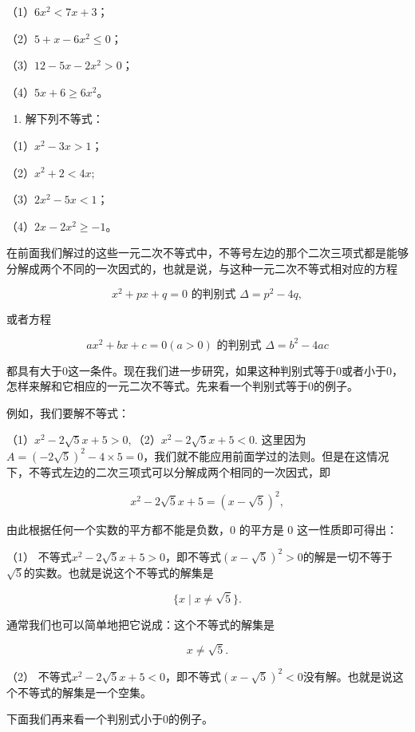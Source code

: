 （1）\(6x^{2} < 7x + 3\)；

（2）\(5 + x - 6x^{2} \leqslant 0\)；

（3）\(12 - 5x - 2x^{2} > 0\)；

（4）\(5x + 6 \geqslant 6x^{2}\)。

\begin{enumerate}[start=3]
\item
  解下列不等式：
\end{enumerate}

（1）\(x^{2} - 3x > 1\)；

（2）\(x^{2} + 2 < 4x;\)

（3）\(2x^{2} - 5x < 1\)；

（4）\(2x - 2x^{2} \geqslant -1\)。

在前面我们解过的这些一元二次不等式中，不等号左边的那个二次三项式都是能够分解成两个不同的一次因式的，也就是说，与这种一元二次不等式相对应的方程

\[
x^{2} + p x + q = 0 \text{ 的判别式 } \Delta=p^{2}-4q,
\]

或者方程

\[
a x^{2} + b x + c = 0 (a > 0) \text{ 的判别式 } \Delta = b^{2} - 4 a c
\]

都具有大于0这一条件。现在我们进一步研究，如果这种判别式等于0或者小于0，怎样来解和它相应的一元二次不等式。先来看一个判别式等于0的例子。

例如，我们要解不等式：

（1）\(x^{2} - 2\sqrt{5} x + 5 > 0,\)（2）\(x^{2} - 2\sqrt{5} x + 5 < 0.\)
这里因为\(A = (-2\sqrt{5})^2 - 4 \times 5 = 0\)，我们就不能应用前面学过的法则。但是在这情况下，不等式左边的二次三项式可以分解成两个相同的一次因式，即

\[
x^{2} - 2 \sqrt{5} x + 5 = (x - \sqrt{5})^{2},
\]

由此根据任何一个实数的平方都不能是负数，0 的平方是 0 这一性质即可得出：

（1）
不等式\(x^{2} - 2\sqrt{5} x + 5 > 0\)，即不等式\((x - \sqrt{5})^{2} > 0\)的解是一切不等于\(\sqrt{5}\)的实数。也就是说这个不等式的解集是

\[
\{x \mid x \neq \sqrt{5} \}.
\]

通常我们也可以简单地把它说成：这个不等式的解集是

\[
x \neq \sqrt{5}.
\]

（2）
不等式\(x^{2} - 2\sqrt{5} x + 5 < 0\)，即不等式\((x - \sqrt{5})^{2} < 0\)没有解。也就是说这个不等式的解集是一个空集。

下面我们再来看一个判别式小于0的例子。

